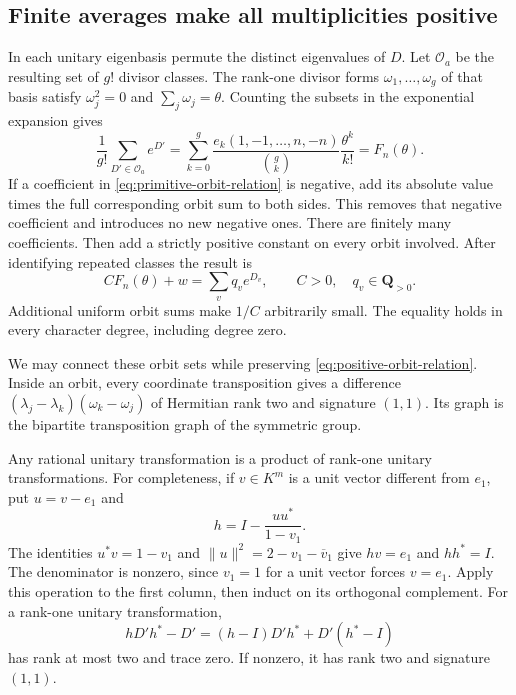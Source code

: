 \subsection{Finite averages make all multiplicities positive}

In each unitary eigenbasis permute the distinct eigenvalues of $D$.
Let $\mathcal O_a$ be the resulting set of $g!$ divisor classes.
The rank-one divisor forms $\omega_1,\ldots,\omega_g$ of that basis
satisfy $\omega_j^2=0$ and $\sum_j\omega_j=\theta$.
Counting the subsets in the exponential expansion gives
\begin{equation}
 \frac1{g!}\sum_{D'\in\mathcal O_a}e^{D'}
 =\sum_{k=0}^g\frac{e_k(1,-1,\ldots,n,-n)}{\binom gk}
                              \frac{\theta^k}{k!}
 =F_n(\theta).
 \label{eq:finite-positive-average}
\end{equation}
If a coefficient in \eqref{eq:primitive-orbit-relation} is negative,
add its absolute value times the full corresponding orbit sum to
both sides.  This removes that negative coefficient and introduces
no new negative ones.  There are finitely many coefficients.
Then add a strictly positive constant on every orbit involved.
After identifying repeated classes the result is
\begin{equation}
 C F_n(\theta)+w=\sum_v q_v e^{D_v},
 \qquad C>0,\quad q_v\in\mathbf Q_{>0}.
 \label{eq:positive-orbit-relation}
\end{equation}
Additional uniform orbit sums make $1/C$ arbitrarily small.
The equality holds in every character degree, including degree zero.

We may connect these orbit sets while preserving
\eqref{eq:positive-orbit-relation}.  Inside an orbit, every coordinate
transposition gives a difference
$(\lambda_j-\lambda_k)(\omega_k-\omega_j)$ of Hermitian rank two
and signature $(1,1)$.  Its graph is the bipartite transposition
graph of the symmetric group.

Any rational unitary transformation is a product of rank-one unitary
transformations.  For completeness, if $v\in K^m$ is a unit vector
different from $e_1$, put $u=v-e_1$ and
\[
 h=I-\frac{uu^*}{1-v_1}.
\]
The identities $u^*v=1-v_1$ and
$\|u\|^2=2-v_1-\overline v_1$ give $hv=e_1$ and $hh^*=I$.
The denominator is nonzero, since $v_1=1$ for a unit vector forces
$v=e_1$.  Apply this operation to the first column, then induct on
its orthogonal complement.  For a rank-one unitary transformation,
\[
 hD'h^*-D'=(h-I)D'h^*+D'(h^*-I)
\]
has rank at most two and trace zero.  If nonzero, it has rank two
and signature $(1,1)$.

